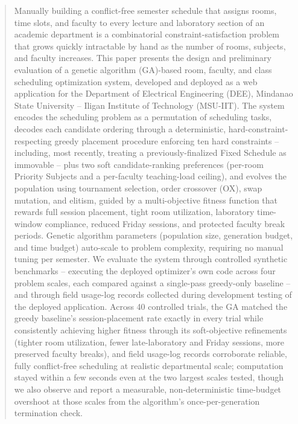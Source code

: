 \documentclass[conference]{IEEEtran}
\begin{document}
\begin{abstract}
Manually building a conflict-free semester schedule that assigns rooms, time slots, and faculty to every lecture and laboratory section of an academic department is a combinatorial constraint-satisfaction problem that grows quickly intractable by hand as the number of rooms, subjects, and faculty increases. This paper presents the design and preliminary evaluation of a genetic algorithm (GA)-based room, faculty, and class scheduling optimization system, developed and deployed as a web application for the Department of Electrical Engineering (DEE), Mindanao State University -- Iligan Institute of Technology (MSU-IIT). The system encodes the scheduling problem as a permutation of scheduling tasks, decodes each candidate ordering through a deterministic, hard-constraint-respecting greedy placement procedure enforcing ten hard constraints -- including, most recently, treating a previously-finalized Fixed Schedule as immovable -- plus two soft candidate-ranking preferences (per-room Priority Subjects and a per-faculty teaching-load ceiling), and evolves the population using tournament selection, order crossover (OX), swap mutation, and elitism, guided by a multi-objective fitness function that rewards full session placement, tight room utilization, laboratory time-window compliance, reduced Friday sessions, and protected faculty break periods. Genetic algorithm parameters (population size, generation budget, and time budget) auto-scale to problem complexity, requiring no manual tuning per semester. We evaluate the system through controlled synthetic benchmarks -- executing the deployed optimizer's own code across four problem scales, each compared against a single-pass greedy-only baseline -- and through field usage-log records collected during development testing of the deployed application. Across 40 controlled trials, the GA matched the greedy baseline's session-placement rate exactly in every trial while consistently achieving higher fitness through its soft-objective refinements (tighter room utilization, fewer late-laboratory and Friday sessions, more preserved faculty breaks), and field usage-log records corroborate reliable, fully conflict-free scheduling at realistic departmental scale; computation stayed within a few seconds even at the two largest scales tested, though we also observe and report a measurable, non-deterministic time-budget overshoot at those scales from the algorithm's once-per-generation termination check.
\end{abstract}
\end{document}

